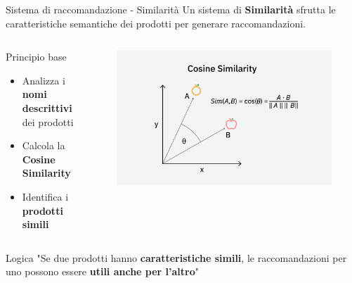 \documentclass{beamer}
\begin{document}
	\begin{frame}{Sistema di raccomandazione - Similarità}
		Un sistema di \textbf{Similarità} sfrutta le caratteristiche semantiche dei prodotti per generare raccomandazioni.

		\begin{columns}
			\begin{column}{0.6\textwidth}
				\begin{block}{Principio base}
					\begin{itemize}
						\item Analizza i \textbf{nomi descrittivi} dei prodotti
						\item Calcola la \textbf{Cosine Similarity}
						\item Identifica i \textbf{prodotti simili}
					\end{itemize}
				\end{block}
			\end{column}
			\begin{column}{0.5\textwidth}
				\begin{figure}
					\centering
					\includegraphics[width=\textwidth]{Cosine-Similarity.png}
				\end{figure}
			\end{column}
		\end{columns}

		\begin{alertblock}{Logica}
			"Se due prodotti hanno \textbf{caratteristiche simili}, le raccomandazioni per uno possono essere \textbf{utili anche per l'altro}"
		\end{alertblock}
	\end{frame}
\end{document}
